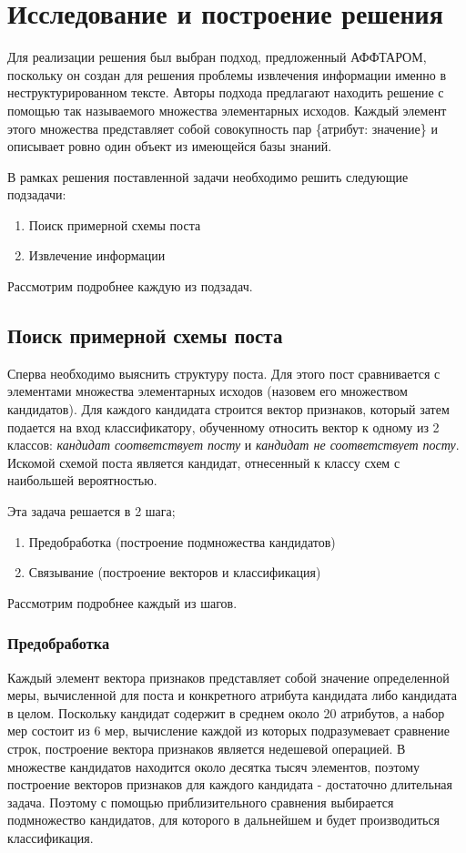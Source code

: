 \chapter{Исследование и построение решения}

Для реализации решения был выбран подход, предложенный АФФТАРОМ, поскольку он создан для решения проблемы извлечения информации именно в неструктурированном тексте. Авторы подхода предлагают находить решение с помощью так называемого множества элементарных исходов. Каждый элемент этого множества представляет собой совокупность пар \{атрибут: значение\} и описывает ровно один объект из имеющейся базы знаний.

В рамках решения поставленной задачи необходимо решить следующие подзадачи:
\begin{enumerate}
	\item Поиск примерной схемы поста
	\item Извлечение информации
\end{enumerate}

Рассмотрим подробнее каждую из подзадач.


\section{Поиск примерной схемы поста}

Сперва необходимо выяснить структуру поста. Для этого пост сравнивается с элементами множества элементарных исходов (назовем его множеством кандидатов). Для каждого кандидата строится вектор признаков, который затем подается на вход классификатору, обученному относить вектор к одному из 2 классов: \textit{кандидат соответствует посту} и \textit{кандидат не соответствует посту}. Искомой схемой поста является кандидат, отнесенный к классу схем с наибольшей вероятностью.

Эта задача решается в 2 шага;
\begin{enumerate}
	\item Предобработка (построение подмножества кандидатов)
	\item Связывание (построение векторов и классификация)
\end{enumerate}

Рассмотрим подробнее каждый из шагов.


\subsection{Предобработка}

Каждый элемент вектора признаков представляет собой значение определенной меры, вычисленной для поста и конкретного атрибута кандидата либо кандидата в целом. Поскольку кандидат содержит в среднем около 20 атрибутов, а набор мер состоит из 6 мер, вычисление каждой из которых подразумевает сравнение строк, построение вектора признаков является недешевой операцией. В множестве кандидатов находится около десятка тысяч элементов, поэтому построение векторов признаков для каждого кандидата - достаточно длительная задача. Поэтому с помощью приблизительного сравнения выбирается подмножество кандидатов, для которого в дальнейшем и будет производиться классификация.

